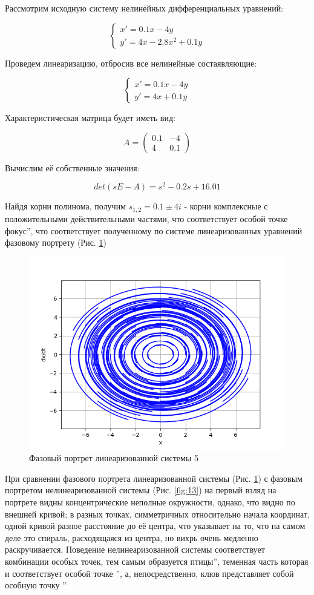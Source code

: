 Рассмотрим исходную систему нелинейных дифференциальных уравнений:

$$
\begin{cases}
x' = 0.1x - 4y \\
y' = 4x - 2.8x^2 + 0.1y
\end{cases}
$$

Проведем линеаризацию, отбросив все нелинейные состаявляющие:

$$
\begin{cases}
	x' = 0.1x - 4y \\
	y' = 4x + 0.1y
\end{cases}
$$

Характеристическая матрица будет иметь вид:

$$
A = 
\begin{pmatrix}
	0.1 & -4 \\
	4 & 0.1
\end{pmatrix}
$$

Вычислим её собственные значения:

$$
det(sE - A) = s^2 - 0.2s + 16.01
$$

Найдя корни полинома, получим $s_{1,2} = 0.1 \pm 4i$ - корни комплексные с положительными действительными частями, 
что соответствует особой точке  фокус\textquotedblright, 
что соответствует полученному по системе линеаризованных уравнений фазовому портрету (Рис. \ref{fig:12})

\begin{figure}[H]
	\centering
	\includegraphics[width=0.6\linewidth]{body/images/Linearized-system-5.png}
	\caption{Фазовый портрет линеаризованной системы 5}
	\label{fig:12}
\end{figure}

При сравнении фазового портрета линеаризованной системы (Рис. \ref{fig:12}) с фазовым портретом нелинеаризованной системы
(Рис. \ref{fig:13}) на первый взляд на портрете видны концентрические неполные окружности, однако, что видно по внешней кривой; 
в разных точках, симметричных относительно начала координат, одной кривой разное расстояние до её центра, что указывает на то, что на самом деле это 
спираль, расходящаяся из центра, но вихрь очень медленно раскручивается. Поведение нелинеаризованной системы соответствует
комбинации особых точек, тем самым образуется  птицы\textquotedblright, теменная часть которая и соответствует особой точке
\textquotedblright, а, непосредственно, клюв представляет собой особную точку \textquotedblright

